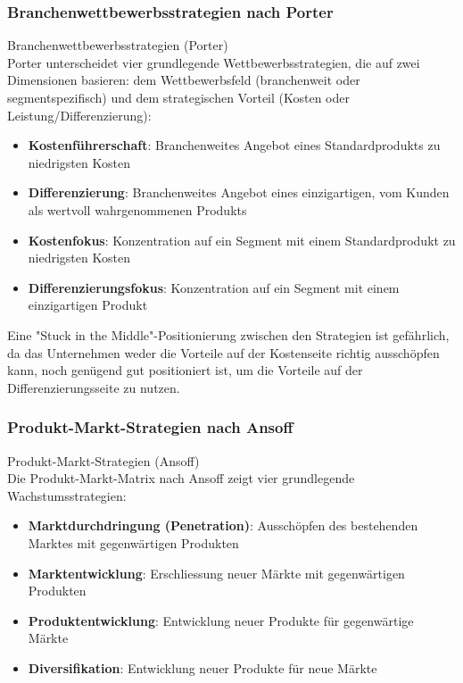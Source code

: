 \subsubsection{Branchenwettbewerbsstrategien nach Porter}

\begin{definition}{Branchenwettbewerbsstrategien (Porter)}\\
Porter unterscheidet vier grundlegende Wettbewerbsstrategien, die auf zwei Dimensionen basieren: dem Wettbewerbsfeld (branchenweit oder segmentspezifisch) und dem strategischen Vorteil (Kosten oder Leistung/Differenzierung):
\begin{itemize}
    \item \textbf{Kostenführerschaft}: Branchenweites Angebot eines Standardprodukts zu niedrigsten Kosten
    \item \textbf{Differenzierung}: Branchenweites Angebot eines einzigartigen, vom Kunden als wertvoll wahrgenommenen Produkts
    \item \textbf{Kostenfokus}: Konzentration auf ein Segment mit einem Standardprodukt zu niedrigsten Kosten
    \item \textbf{Differenzierungsfokus}: Konzentration auf ein Segment mit einem einzigartigen Produkt
\end{itemize}

 Eine "Stuck in the Middle"-Positionierung zwischen den Strategien ist gefährlich, da das Unternehmen weder die Vorteile auf der Kostenseite richtig ausschöpfen kann, noch genügend gut positioniert ist, um die Vorteile auf der Differenzierungsseite zu nutzen.
\end{definition}

\subsubsection{Produkt-Markt-Strategien nach Ansoff}

\begin{definition}{Produkt-Markt-Strategien (Ansoff)}\\
Die Produkt-Markt-Matrix nach Ansoff zeigt vier grundlegende Wachstumsstrategien:
\begin{itemize}
    \item \textbf{Marktdurchdringung (Penetration)}: Ausschöpfen des bestehenden Marktes mit gegenwärtigen Produkten
    \item \textbf{Marktentwicklung}: Erschliessung neuer Märkte mit gegenwärtigen Produkten
    \item \textbf{Produktentwicklung}: Entwicklung neuer Produkte für gegenwärtige Märkte
    \item \textbf{Diversifikation}: Entwicklung neuer Produkte für neue Märkte
\end{itemize}
\end{definition}

